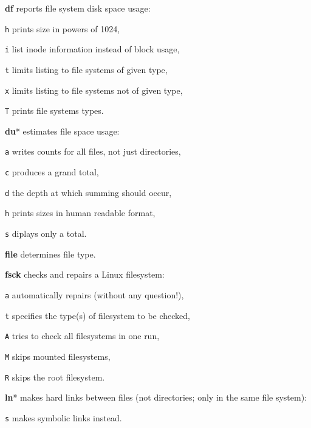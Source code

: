 \begin{enumx}
	\item [\cmd] \textbf{df} reports file system disk space usage:
	\item [\texttt{h}] prints size in powers of 1024,
	\item [\texttt{i}] list inode information instead of block usage,
	\item [\texttt{t}] limits listing to file systems of given type,
	\item [\texttt{x}] limits listing to file systems not of given type,
	\item [\texttt{T}] prints file systems types.
	
	\item [\cmd] \textbf{du}* estimates file space usage:
	\item [\texttt{a}] writes counts for all files, not just directories,
	\item [\texttt{c}] produces a grand total,
	\item [\texttt{d}] the depth at which summing should occur,
	\item [\texttt{h}] prints sizes in human readable format,
	\item [\texttt{s}] diplays only a total.
\end{enumx}


\begin{enumx}
	\item [\cmd] \textbf{file} determines file type.
\end{enumx}

\begin{enumx}
	\item [\cmd] \textbf{fsck} checks and repairs a Linux filesystem:
	\item [\texttt{a}] automatically repairs (without any question!),
	\item [\texttt{t}] specifies the type(s) of filesystem to be checked,
	\item [\texttt{A}] tries to check all filesystems in one run,
	\item [\texttt{M}] skips mounted filesystems,
	\item [\texttt{R}] skips the root filesystem.
\end{enumx}

\begin{enumx}
	\item [\cmd] \textbf{ln}* makes hard links between files
	(not directories; only in the same file system):
	\item [\texttt{s}]  makes symbolic links instead.
\end{enumx}

